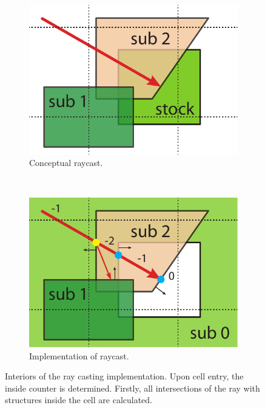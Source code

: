 \begin{figure}
	\centering
	\begin{subfigure}[t]{0.44\textwidth}
		\centering
		\includegraphics[width=\textwidth]{images/raycast_grid}
		\caption{
			Conceptual raycast.
		}
		\label{fig:raycast_grid}
	\end{subfigure}
	~
	\begin{subfigure}[t]{0.44\textwidth}
		\centering
		\includegraphics[width=\textwidth]{images/raycast_inside_counter}
		\caption{
			Implementation of raycast.
		}
		\label{fig:raycast_inside_counter}
	\end{subfigure}
	\caption{
		Interiors of the ray casting implementation.
		Upon cell entry, the inside counter is determined.
		Firstly, all intersections of the ray with structures inside the cell are calculated.
}
\end{figure}
